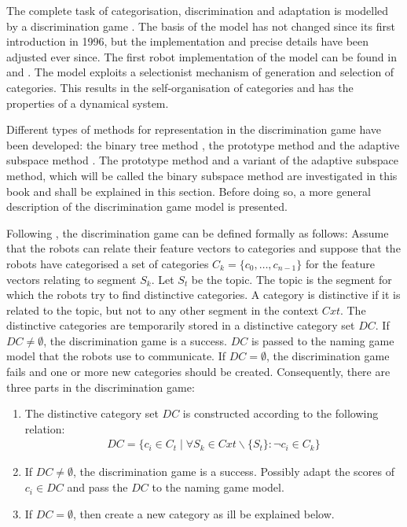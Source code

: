 The complete task of categorisation, discrimination and adaptation is modelled by a discrimination game \citep{steels:1996b}. The basis of the model has not changed since its first introduction in 1996, but the implementation and precise details have been adjusted ever since. The first robot implementation of the model can be found in \citealt{steelsvogt:1997} and \citealt{vogt:1998a}. The model exploits a selectionist mechanism of generation and selection of categories. This results in the self-organisation of categories and has the properties of a dynamical system.

Different types of methods for representation in the discrimination game have been developed: the binary tree method \citep{steels:1996b}, the prototype method \citep{dejongvogt:1998,vogt:1998b} and the adaptive subspace method \citep{dejongvogt:1998,dejong:2000}. The prototype method and a variant of the adaptive subspace method, which will be called the binary subspace method are investigated in this book and shall be explained in this section. Before doing so, a more general description of the discrimination game model is presented.

Following \citet{steels:1996b}, the discrimination game can be defined formally as follows: Assume that the robots can relate their feature vectors to categories and suppose that the robots have categorised a set of categories $C_k=\{c_0,\ldots,c_{n-1}\}$ for the feature vectors relating to segment $S_k$. Let $S_t$ be the topic. The topic is the segment for which the robots try to find distinctive categories. A category is distinctive if it is related to the topic, but not to any other segment in the context $Cxt$. The distinctive categories are temporarily stored in a distinctive category set $DC$. If $DC \neq \emptyset$, the discrimination game is a success. $DC$ is passed to the naming game model that the robots use to communicate. If $DC=\emptyset$, the discrimination game fails and one or more new categories should be created. Consequently, there are three parts in the discrimination game:

\begin{enumerate}
\item The distinctive category set $DC$ is constructed according to the following relation: \begin{eqnarray}DC = \{c_i \in C_t \mid \forall S_k \in Cxt \backslash \{S_t\}: \neg c_i \in C_k\}\end{eqnarray}

\item If $DC \neq \emptyset$, the discrimination game is a success. Possibly adapt the scores of $c_i \in DC$ and pass the $DC$ to the naming game model.

\item If $DC = \emptyset$, then create a new category as ill be explained below.

\end{enumerate}

